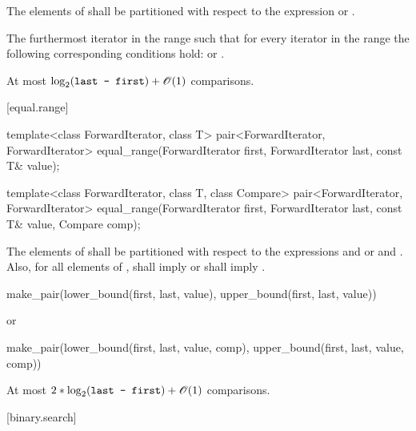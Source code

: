 \begin{itemdescr}
\pnum
\requires
The elements
of
shall be partitioned with respect to the expression
or
.

\pnum
\returns
The furthermost iterator
in the range
such that for every iterator
in the range
the following corresponding conditions hold:
or
.

\pnum
\complexity
At most
$\log_2(\texttt{last - first}) + \mathscr{O}(1)$
comparisons.
\end{itemdescr}

[equal.range]{}

%
\begin{itemdecl}
template<class ForwardIterator, class T>
  pair<ForwardIterator, ForwardIterator>
    equal_range(ForwardIterator first,
                ForwardIterator last, const T& value);

template<class ForwardIterator, class T, class Compare>
  pair<ForwardIterator, ForwardIterator>
    equal_range(ForwardIterator first,
                ForwardIterator last, const T& value,
                Compare comp);
\end{itemdecl}

\begin{itemdescr}
\pnum
\requires
The elements
of
shall be partitioned with respect to the expressions
and
or
and
.
Also, for all elements
of
\tcode{[first, last)},
shall imply
or
shall imply
.

\pnum
\returns
\begin{codeblock}
make_pair(lower_bound(first, last, value),
          upper_bound(first, last, value))
\end{codeblock}
or
\begin{codeblock}
make_pair(lower_bound(first, last, value, comp),
          upper_bound(first, last, value, comp))
\end{codeblock}

\pnum
\complexity
At most
$2 * \log_2(\texttt{last - first}) + \mathscr{O}(1)$
comparisons.
\end{itemdescr}

[binary.search]{}

